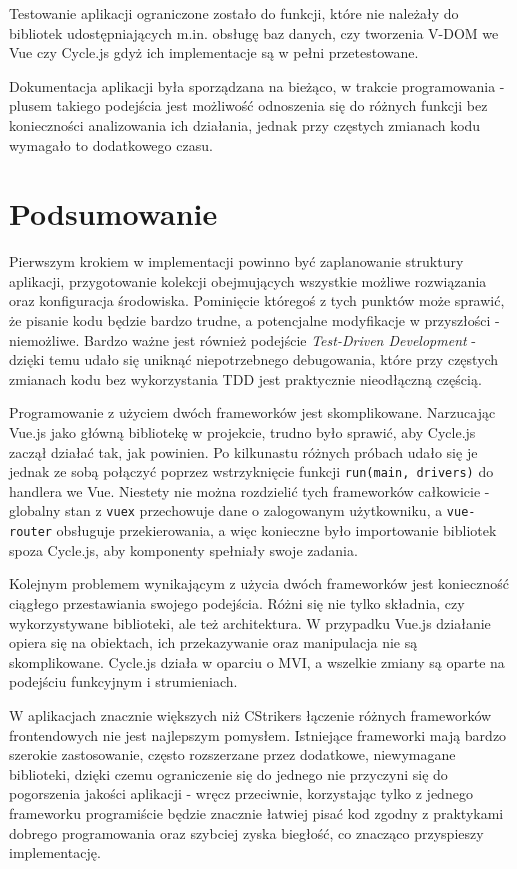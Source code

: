 \documentclass[shortabstract]{iithesis}
\theoremstyle{definition} \newtheorem{definition}{Definicja}[]
\theoremstyle{remark} \newtheorem{remark}[definition]{Observation}
\theoremstyle{plain} \newtheorem{theorem}[definition]{Theorem}
\theoremstyle{plain} \newtheorem{lemma}[definition]{Lemma}
\begin{document}
Testowanie aplikacji ograniczone zostało do funkcji, które nie należały do bibliotek udostępniających m.in. obsługę baz danych, czy tworzenia V-DOM we Vue czy Cycle.js gdyż ich implementacje są w pełni przetestowane.

Dokumentacja aplikacji była sporządzana na bieżąco, w trakcie programowania - plusem takiego podejścia jest możliwość odnoszenia się do różnych funkcji bez konieczności analizowania ich działania, jednak przy częstych zmianach kodu wymagało to dodatkowego czasu.

\chapter{Podsumowanie}
Pierwszym krokiem w implementacji powinno być zaplanowanie struktury aplikacji, przygotowanie kolekcji obejmujących wszystkie możliwe rozwiązania oraz konfiguracja środowiska. Pominięcie któregoś z tych punktów może sprawić, że pisanie kodu będzie bardzo trudne, a potencjalne modyfikacje w przyszłości - niemożliwe. Bardzo ważne jest również podejście \textit{Test-Driven Development} - dzięki temu udało się uniknąć niepotrzebnego debugowania, które przy częstych zmianach kodu bez wykorzystania TDD jest praktycznie nieodłączną częścią.

Programowanie z użyciem dwóch frameworków jest skomplikowane. Narzucając Vue.js jako główną bibliotekę w projekcie, trudno było sprawić, aby Cycle.js zaczął działać tak, jak powinien. Po kilkunastu różnych próbach udało się je jednak ze sobą połączyć poprzez wstrzyknięcie funkcji \texttt{run(main, drivers)} do handlera we Vue. Niestety nie można rozdzielić tych frameworków całkowicie - globalny stan z \texttt{vuex} przechowuje dane o zalogowanym użytkowniku, a \texttt{vue-router} obsługuje przekierowania, a więc konieczne było importowanie bibliotek spoza Cycle.js, aby komponenty spełniały swoje zadania.

Kolejnym problemem wynikającym z użycia dwóch frameworków jest konieczność ciągłego przestawiania swojego podejścia. Różni się nie tylko składnia, czy wykorzystywane biblioteki, ale też architektura. W przypadku Vue.js działanie opiera się na obiektach, ich przekazywanie oraz manipulacja nie są skomplikowane. Cycle.js działa w oparciu o MVI, a wszelkie zmiany są oparte na podejściu funkcyjnym i strumieniach.

W aplikacjach znacznie większych niż CStrikers łączenie różnych frameworków frontendowych nie jest najlepszym pomysłem. Istniejące frameworki mają bardzo szerokie zastosowanie, często rozszerzane przez dodatkowe, niewymagane biblioteki, dzięki czemu ograniczenie się do jednego nie przyczyni się do pogorszenia jakości aplikacji - wręcz przeciwnie, korzystając tylko z jednego frameworku programiście będzie znacznie łatwiej pisać kod zgodny z praktykami dobrego programowania oraz szybciej zyska biegłość, co znacząco przyspieszy implementację.
\end{document}
